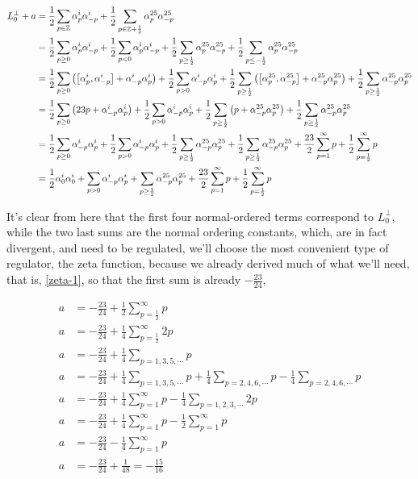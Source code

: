 \begin{align*}
    L^\perp_0+a&=\frac12\sum\limits_{p\in\mathbb Z}\alpha^i_p\alpha^i_{-p}+\frac12\sum\limits_{p\in\mathbb Z+\frac12}\alpha^{25}_p\alpha^{25}_{-p}\\
    &=\frac12\sum\limits_{p\geq 0}\alpha^i_p\alpha^i_{-p}+\frac12\sum\limits_{p< 0}\alpha^i_p\alpha^i_{-p}+\frac12\sum\limits_{p\geq\frac12}\alpha^{25}_p\alpha^{25}_{-p}+\frac12\sum\limits_{p\leq-\frac12}\alpha^{25}_p\alpha^{25}_{-p}\\
    &=\frac12\sum\limits_{p\geq 0}\qty(\comm{\alpha^i_p}{\alpha^i_{-p}}+\alpha^i_{-p}\alpha_p^i)+\frac12\sum\limits_{p> 0}\alpha^i_{-p}\alpha^i_{p}+\frac12\sum\limits_{p\geq\frac12}\qty(\comm{\alpha^{25}_p}{\alpha^{25}_{-p}}+\alpha^{25}_{-p}\alpha^{25}_p)+\frac12\sum\limits_{p\geq\frac12}\alpha^{25}_{-p}\alpha^{25}_{p}\\
    &=\frac12\sum\limits_{p\geq 0}\qty(23p+\alpha^i_{-p}\alpha_p^i)+\frac12\sum\limits_{p> 0}\alpha^i_{-p}\alpha^i_{p}+\frac12\sum\limits_{p\geq\frac12}\qty(p+\alpha^{25}_{-p}\alpha^{25}_p)+\frac12\sum\limits_{p\geq\frac12}\alpha^{25}_{-p}\alpha^{25}_{p}\\
    &=\frac12\sum\limits_{p\geq 0}\alpha^i_{-p}\alpha_p^i+\frac12\sum\limits_{p> 0}\alpha^i_{-p}\alpha^i_{p}+\frac12\sum\limits_{p\geq\frac12}\alpha^{25}_{-p}\alpha^{25}_p+\frac12\sum\limits_{p\geq\frac12}\alpha^{25}_{-p}\alpha^{25}_{p}+\frac{23}{2}\sum\limits_{p=1}^\infty p+\frac12\sum\limits_{p=\frac12}^\infty p\\
    &=\frac12\alpha_0^i\alpha_0^i+\sum\limits_{p> 0}\alpha^i_{-p}\alpha^i_{p}+\sum\limits_{p\geq\frac12}\alpha^{25}_{-p}\alpha^{25}_{p}+\frac{23}{2}\sum\limits_{p=1}^\infty p+\frac12\sum\limits_{p=\frac12}^\infty p
\end{align*}

It's clear from here that the first four normal-ordered terms correspond to $L^\perp_0$, while the two last sums are the normal ordering constants, which, 
are in fact divergent, and need to be regulated, we'll choose the most convenient type of regulator, the zeta function, because we already derived much of what we'll 
need, that is, \ref{zeta-1}, so that the first sum is already $-\frac{23}{24}$,

\begin{align*}
    a&=-\frac{23}{24}+\frac12\sum\limits_{p=\frac12}^\infty p\\
    a&=-\frac{23}{24}+\frac14\sum\limits_{p=\frac12}^\infty 2p\\
    a&=-\frac{23}{24}+\frac14\sum\limits_{p=1,3,5,\cdots} p\\
    a&=-\frac{23}{24}+\frac14\sum\limits_{p=1,3,5,\cdots} p+\frac14\sum\limits_{p=2,4,6,\cdots}p-\frac14\sum\limits_{p=2,4,6,\cdots}p\\
    a&=-\frac{23}{24}+\frac14\sum\limits_{p=1}^\infty p-\frac14\sum\limits_{p=1,2,3,\cdots}2p\\
    a&=-\frac{23}{24}+\frac14\sum\limits_{p=1}^\infty p-\frac12\sum\limits_{p=1}^\infty p\\
    a&=-\frac{23}{24}-\frac14\sum\limits_{p=1}^\infty p\\
    a&=-\frac{23}{24}+\frac{1}{48}=-\frac{15}{16}
\end{align*}

